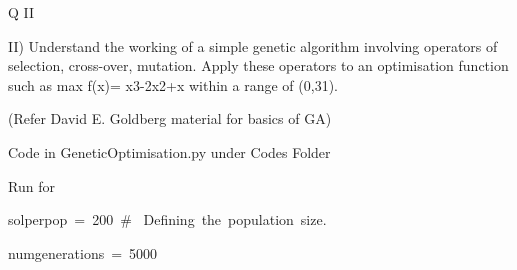 \documentclass[12pt]{article}
\renewcommand{\_}{\kern-1.5pt\textunderscore\kern-1.5pt}
\begin{document}
\vspace{\baselineskip}

\vspace{\baselineskip}

\vspace{\baselineskip}

\vspace{\baselineskip}

\vspace{\baselineskip}

\vspace{\baselineskip}

\vspace{\baselineskip}

\vspace{\baselineskip}

\vspace{\baselineskip}
\begin{Center}
{\fontsize{28pt}{33.6pt}\selectfont Q II\par}
\end{Center}\par

{\fontsize{14pt}{16.8pt}\selectfont II) Understand the working of a simple genetic algorithm involving operators of selection, cross-over, mutation. Apply these operators to an optimisation function such as max f(x)= x3-2x2+x within a range of (0,31).\par}\par

{\fontsize{14pt}{16.8pt}\selectfont (Refer David E. Goldberg material for basics of GA)\par}\par


\vspace{\baselineskip}
{\fontsize{14pt}{16.8pt}\selectfont Code in GeneticOptimisation.py under Codes Folder\par}\par

{\fontsize{14pt}{16.8pt}\selectfont Run for\par}\par

\setlength{\parskip}{0.0pt}
{\fontsize{10pt}{12.0pt}\selectfont \textcolor[HTML]{D4D4D4}{sol\_per\_pop = 200 $\#$  Defining the population size.}\par}\par

{\fontsize{10pt}{12.0pt}\selectfont \textcolor[HTML]{D4D4D4}{num\_generations = 5000}\par}\par
\end{document}
